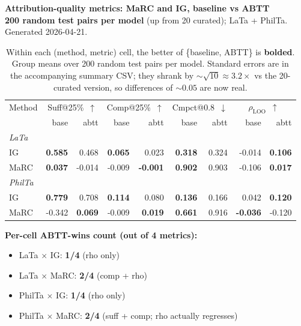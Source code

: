 \documentclass[11pt]{article}
\begin{document}
\begin{center}
{\large\bfseries Attribution-quality metrics: MaRC and IG, baseline vs ABTT}\\[2pt]
{\small \textbf{200 random test pairs per model} (up from 20 curated); LaTa + PhilTa.\\
Generated 2026-04-21.}
\end{center}

\vspace{0.4em}

\begin{table}[h]
\centering
\footnotesize
\setlength{\tabcolsep}{3pt}
\begin{tabular}{lrrrrrrrr}
\toprule
Method & \multicolumn{2}{c}{Suff@25\%~$\uparrow$} & \multicolumn{2}{c}{Comp@25\%~$\uparrow$} & \multicolumn{2}{c}{Cmpct@0.8~$\downarrow$} & \multicolumn{2}{c}{$\rho_{\text{LOO}}$~$\uparrow$} \\
\cmidrule(lr){2-3} \cmidrule(lr){4-5} \cmidrule(lr){6-7} \cmidrule(lr){8-9}
 & base & abtt & base & abtt & base & abtt & base & abtt \\
\midrule
\multicolumn{9}{l}{\textit{LaTa}} \\
IG   & \textbf{0.585} & 0.468          & \textbf{0.065} & 0.023          & \textbf{0.318} & 0.324 & -0.014 & \textbf{0.106} \\
MaRC & \textbf{0.037} & -0.014         & -0.009         & \textbf{-0.001} & \textbf{0.902} & 0.903 & -0.106 & \textbf{0.017} \\
\midrule
\multicolumn{9}{l}{\textit{PhilTa}} \\
IG   & \textbf{0.779} & 0.708          & \textbf{0.114} & 0.080          & \textbf{0.136} & 0.166 & 0.042  & \textbf{0.120} \\
MaRC & -0.342         & \textbf{0.069} & -0.009         & \textbf{0.019} & \textbf{0.661} & 0.916 & \textbf{-0.036} & -0.120 \\
\bottomrule
\end{tabular}
\caption*{Within each (method, metric) cell, the better of \{baseline, ABTT\} is \textbf{bolded}. Group means over 200 random test pairs per model. Standard errors are in the accompanying summary CSV; they shrank by $\sim\sqrt{10} \approx 3.2\times$ vs the 20-curated version, so differences of $\sim 0.05$ are now real.}
\end{table}

\vspace{0.4em}

\noindent\textbf{Per-cell ABTT-wins count (out of 4 metrics):}
\begin{itemize}
\itemsep0em
\item LaTa $\times$ IG: \textbf{1/4} (rho only)
\item LaTa $\times$ MaRC: \textbf{2/4} (comp + rho)
\item PhilTa $\times$ IG: \textbf{1/4} (rho only)
\item PhilTa $\times$ MaRC: \textbf{2/4} (suff + comp; rho actually regresses)
\end{itemize}
\end{document}
